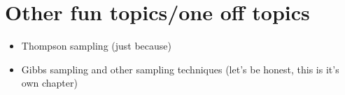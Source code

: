 
\chapter{Other fun topics/one off topics}
\begin{itemize}
  \item Thompson sampling (just because)
  \item Gibbs sampling and other sampling techniques (let's be honest, this is it's own chapter)
\end{itemize}